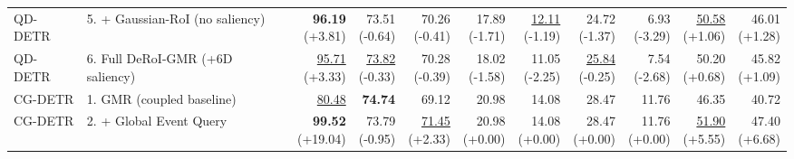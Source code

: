 \documentclass{article}
\begin{document}
{\begin{tabular}{llrrrrrrrrr}
QD-DETR & 5. + Gaussian-RoI (no saliency) & \shortstack{\textbf{96.19} \\ {\scriptsize (+3.81)}} & \shortstack{73.51 \\ {\scriptsize (-0.64)}} & \shortstack{70.26 \\ {\scriptsize (-0.41)}} & \shortstack{17.89 \\ {\scriptsize (-1.71)}} & \shortstack{\underline{12.11} \\ {\scriptsize (-1.19)}} & \shortstack{24.72 \\ {\scriptsize (-1.37)}} & \shortstack{6.93 \\ {\scriptsize (-3.29)}} & \shortstack{\underline{50.58} \\ {\scriptsize (+1.06)}} & \shortstack{46.01 \\ {\scriptsize (+1.28)}} \\
QD-DETR & 6. Full DeRoI-GMR (+6D saliency) & \shortstack{\underline{95.71} \\ {\scriptsize (+3.33)}} & \shortstack{\underline{73.82} \\ {\scriptsize (-0.33)}} & \shortstack{70.28 \\ {\scriptsize (-0.39)}} & \shortstack{18.02 \\ {\scriptsize (-1.58)}} & \shortstack{11.05 \\ {\scriptsize (-2.25)}} & \shortstack{\underline{25.84} \\ {\scriptsize (-0.25)}} & \shortstack{7.54 \\ {\scriptsize (-2.68)}} & \shortstack{50.20 \\ {\scriptsize (+0.68)}} & \shortstack{45.82 \\ {\scriptsize (+1.09)}} \\
\midrule
CG-DETR & 1. GMR (coupled baseline) & \underline{80.48} & \textbf{74.74} & 69.12 & 20.98 & 14.08 & 28.47 & 11.76 & 46.35 & 40.72 \\
CG-DETR & 2. + Global Event Query & \shortstack{\textbf{99.52} \\ {\scriptsize (+19.04)}} & \shortstack{73.79 \\ {\scriptsize (-0.95)}} & \shortstack{\underline{71.45} \\ {\scriptsize (+2.33)}} & \shortstack{20.98 \\ {\scriptsize (+0.00)}} & \shortstack{14.08 \\ {\scriptsize (+0.00)}} & \shortstack{28.47 \\ {\scriptsize (+0.00)}} & \shortstack{11.76 \\ {\scriptsize (+0.00)}} & \shortstack{\underline{51.90} \\ {\scriptsize (+5.55)}} & \shortstack{47.40 \\ {\scriptsize (+6.68)}} \\

\end{tabular}}
\end{document}
